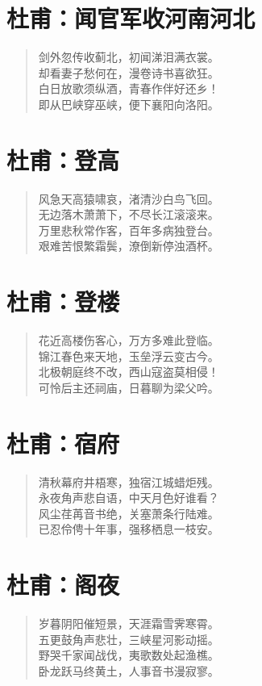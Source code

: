 \documentclass[12pt,oneside]{book}
\newenvironment{shici}{
\begin{verse}
\centering\large\hspace{12pt}}
{\end{verse}}
\begin{document}
\chapter{杜甫：闻官军收河南河北}
\begin{shici}
剑外忽传收蓟北，初闻涕泪满衣裳。\\
却看妻子愁何在，漫卷诗书喜欲狂。\\
白日放歌须纵酒，青春作伴好还乡！\\
即从巴峡穿巫峡，便下襄阳向洛阳。
\end{shici}

\chapter{杜甫：登高}
\begin{shici}
风急天高猿啸哀，渚清沙白鸟飞回。\\
无边落木萧萧下，不尽长江滚滚来。\\
万里悲秋常作客，百年多病独登台。\\
艰难苦恨繁霜鬓，潦倒新停浊酒杯。
\end{shici}

\chapter{杜甫：登楼}
\begin{shici}
花近高楼伤客心，万方多难此登临。\\
锦江春色来天地，玉垒浮云变古今。\\
北极朝庭终不改，西山寇盗莫相侵！\\
可怜后主还祠庙，日暮聊为梁父吟。
\end{shici}

\chapter{杜甫：宿府}
\begin{shici}
清秋幕府井梧寒，独宿江城蜡炬残。\\
永夜角声悲自语，中天月色好谁看？\\
风尘荏苒音书绝，关塞萧条行陆难。\\
已忍伶俜十年事，强移栖息一枝安。
\end{shici}

\chapter{杜甫：阁夜}
\begin{shici}
岁暮阴阳催短景，天涯霜雪霁寒霄。\\
五更鼓角声悲壮，三峡星河影动摇。\\
野哭千家闻战伐，夷歌数处起渔樵。\\
卧龙跃马终黄土，人事音书漫寂寥。
\end{shici}
\end{document}
